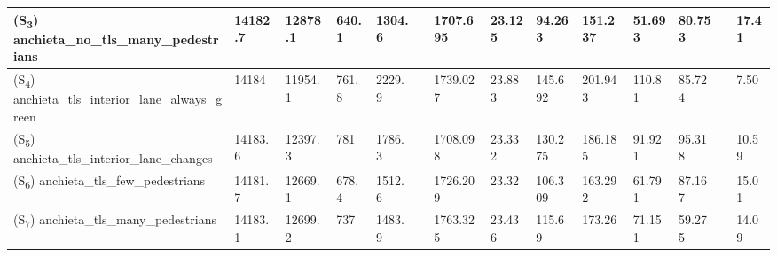 \begin{table}
{\begin{tabular}{llllllllllllll}
    (S\textsubscript{3}) anchieta\_no\_tls\_many\_pedestrians                    & 14182.7                      & 12878.1                        & 640.1                            & 1304.6                          &  & 1707.695                         & 23.125                              & 94.263                             & 151.237                           & 51.693                           & 80.753                          &  & 17.41                             \\ \hline
    (S\textsubscript{4}) anchieta\_tls\_interior\_lane\_always\_green      & 14184                        & 11954.1                        & 761.8                            & 2229.9                          &  & 1739.027                         & 23.883                              & 145.692                            & 201.943                           & 110.81                           & 85.724                          &  & 7.50                              \\ \hline
    (S\textsubscript{5}) anchieta\_tls\_interior\_lane\_changes            & 14183.6                      & 12397.3                        & 781                              & 1786.3                          &  & 1708.098                         & 23.332                              & 130.275                            & 186.185                           & 91.921                           & 95.318                          &  & 10.59                             \\ \hline
    (S\textsubscript{6}) anchieta\_tls\_few\_pedestrians                & 14181.7                      & 12669.1                        & 678.4                            & 1512.6                          &  & 1726.209                         & 23.32                               & 106.309                            & 163.292                           & 61.791                           & 87.167                          &  & 15.01                             \\ \hline
    (S\textsubscript{7}) anchieta\_tls\_many\_pedestrians               & 14183.1                      & 12699.2                        & 737                              & 1483.9                          &  & 1763.325                         & 23.436                              & 115.69                             & 173.26                            & 71.151                           & 59.275                          &  & 14.09                             \\ \hline
    \end{tabular}}
\end{table}


